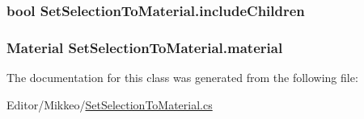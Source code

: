 \subsubsection[{\texorpdfstring{include\+Children}{includeChildren}}]{\setlength{\rightskip}{0pt plus 5cm}bool Set\+Selection\+To\+Material.\+include\+Children}\hypertarget{class_set_selection_to_material_a495b433f7c0a652fa371258946b21a42}{}\label{class_set_selection_to_material_a495b433f7c0a652fa371258946b21a42}
\subsubsection[{\texorpdfstring{material}{material}}]{\setlength{\rightskip}{0pt plus 5cm}Material Set\+Selection\+To\+Material.\+material}\hypertarget{class_set_selection_to_material_ab017fca0bbb5ec03ca059b926cd894bf}{}\label{class_set_selection_to_material_ab017fca0bbb5ec03ca059b926cd894bf}


The documentation for this class was generated from the following file\+:\begin{DoxyCompactItemize}
\item 
Editor/\+Mikkeo/\hyperlink{_set_selection_to_material_8cs}{Set\+Selection\+To\+Material.\+cs}\end{DoxyCompactItemize}
